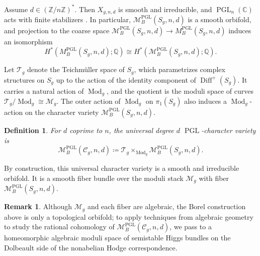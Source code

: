 \documentclass[11pt,reqno]{amsart}
\theoremstyle{plain} %
\newtheorem{definition}[theorem]{Definition}
\theoremstyle{definition}
\newtheorem{remark}[theorem]{Remark}
\newcommand{\QQ}{\mathbb{Q}}
\newcommand{\CC}{\mathbb{C}}
\newcommand{\M}{\mathcal{M}}
\newcommand{\C}{\mathcal{C}}
\newcommand{\mc}{\mathcal}
\newcommand{\ZZ}{\mathbb{Z}}
\DeclareMathOperator{\Diff}{Diff}
\DeclareMathOperator{\PGL}{PGL}
\DeclareMathOperator{\Mod}{Mod}
\begin{document}
Assume $d \in (\ZZ/n\ZZ)^*$. Then $X_{g,n,d}$ is smooth and irreducible, and $\PGL_n(\CC)$ acts with finite stabilizers \cite[Theorem~2.2.12 and Corollary~3.5.5]{Hausel-RV}.
In particular, $\M_{B}^{\PGL}(S_g,n,d)$ is a smooth orbifold, and projection to the coarse space $\M_{B}^{\PGL}(S_g,n,d) \to M_B^{\PGL}(S_g,n,d)$ induces an isomorphism %
\begin{equation}\label{eq:coarsespaceiso-PGL}
H^*(M_B^{\PGL}(S_g,n,d);\QQ) \cong H^*(\M_{B}^{\PGL}(S_g,n,d);\QQ).
\end{equation}



 


Let $\mc T_g$ denote the Teichm\"uller space of $S_g$, which parametrizes complex structures on $S_g$ up to the action of the identity component of $\Diff^+(S_g)$. It carries a natural action of $\Mod_g$, and the quotient is the moduli space of curves $\mc T_g / \Mod_g \cong \M_g$. The outer action of $\Mod_g$ on $\pi_1(S_g)$ also induces a $\Mod_g$-action on the character variety $\M_{B}^{\PGL}(S_g,n,d)$.

\begin{definition}\label{defn: relative total PGL}
	For $d$ coprime to $n$, the \emph{universal degree $d$ $\PGL$-character variety} is 
	\begin{equation*}
		\M_{B}^{\PGL}(\C_g, n, d) \coloneqq \mc T_g \times_{\Mod_g} \M_{B}^{\PGL}(S_g,n,d).
	\end{equation*}
\end{definition}

\noindent By construction, this universal character variety is a smooth and irreducible orbifold. It is a smooth fiber bundle over the moduli stack $\M_g$ with fiber $\M_{B}^{\PGL}(S_g, n, d)$.

\begin{remark}
Although $\M_g$ and each fiber are algebraic, the Borel construction above is only a topological orbifold; to apply techniques from algebraic geometry to study the rational cohomology of $\M_B^{\PGL}(\C_g, n, d)$, we pass to a homeomorphic algebraic moduli space of semistable Higgs bundles on the Dolbeault side of the nonabelian Hodge correspondence.
\end{remark}
\end{document}
